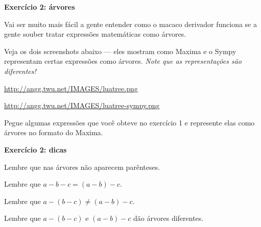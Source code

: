 \documentclass[oneside,12pt]{article}
\begin{document}

\newpage

%                                        

{\bf Exercício 2: árvores}

\ssk

Vai ser muito mais fácil a gente entender como o macaco derivador
funciona se a gente souber tratar expressões matemáticas como árvores.

Veja os dois screenshots abaixo --- eles mostram como Maxima e o Sympy
representam certas expressões como árvores. {\sl Note que as
  representações são diferentes!}

\ssk


\url{http://angg.twu.net/IMAGES/luatree.png}

\url{http://angg.twu.net/IMAGES/luatree-sympy.png}

\ssk

Pegue algumas expressões que você obteve no exercício 1 e represente
elas como árvores no formato do Maxima.


\newpage


{\bf Exercício 2: dicas}

\ssk

Lembre que nas árvores não aparecem parênteses.

Lembre que $a-b-c = (a-b)-c$.

Lembre que $a-(b-c) ≠ (a-b)-c$.

Lembre que $a-(b-c)$ e $(a-b)-c$ dão árvores diferentes.
\end{document}
